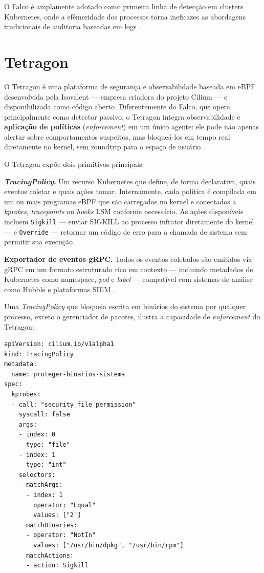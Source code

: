 O Falco é amplamente adotado como primeira linha de detecção em clusters Kubernetes,
onde a efêmeridade dos processos torna ineficazes as abordagens tradicionais de
auditoria baseadas em logs \cite{cassagnes2020}.

\section{Tetragon}

O Tetragon é uma plataforma de segurança e observabilidade baseada em eBPF
desenvolvida pela Isovalent --- empresa criadora do projeto Cilium --- e
disponibilizada como código aberto.
Diferentemente do Falco, que opera principalmente como detector passivo, o Tetragon
integra observabilidade e \textbf{aplicação de políticas} (\textit{enforcement})
em um único agente: ele pode não apenas alertar sobre comportamentos suspeitos,
mas bloqueá-los em tempo real diretamente no kernel, sem roundtrip para o espaço
de usuário \cite{linuxkernel2024,gregg2019}.

O Tetragon expõe dois primitivos principais:

\textbf{\textit{TracingPolicy}.}
Um recurso Kubernetes que define, de forma declarativa, quais eventos coletar e
quais ações tomar.
Internamente, cada política é compilada em um ou mais programas eBPF que são
carregados no kernel e conectados a \textit{kprobes}, \textit{tracepoints} ou
\textit{hooks} LSM conforme necessário.
As ações disponíveis incluem \texttt{Sigkill} --- enviar SIGKILL ao processo
infrator diretamente do kernel --- e \texttt{Override} --- retornar um código de
erro para a chamada de sistema sem permitir sua execução \cite{linuxkernel2024}.

\textbf{Exportador de eventos gRPC.}
Todos os eventos coletados são emitidos via gRPC em um formato estruturado rico em
contexto --- incluindo metadados de Kubernetes como namespace, \textit{pod} e
\textit{label} --- compatível com sistemas de análise como Hubble e plataformas
SIEM \cite{majors2022}.

Uma \textit{TracingPolicy} que bloqueia escrita em binários do sistema por qualquer
processo, exceto o gerenciador de pacotes, ilustra a capacidade de
\textit{enforcement} do Tetragon:

\begin{lstlisting}[language={},
  caption={TracingPolicy Tetragon bloqueando escrita em diretórios de sistema.}]
apiVersion: cilium.io/v1alpha1
kind: TracingPolicy
metadata:
  name: proteger-binarios-sistema
spec:
  kprobes:
  - call: "security_file_permission"
    syscall: false
    args:
    - index: 0
      type: "file"
    - index: 1
      type: "int"
    selectors:
    - matchArgs:
      - index: 1
        operator: "Equal"
        values: ["2"]
      matchBinaries:
      - operator: "NotIn"
        values: ["/usr/bin/dpkg", "/usr/bin/rpm"]
      matchActions:
      - action: Sigkill
\end{lstlisting}

